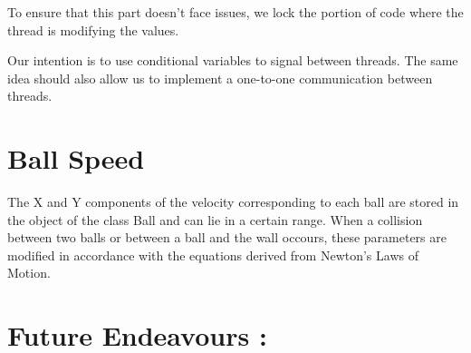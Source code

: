 \documentclass[]{article}
\begin{document}
To ensure that this part doesn't face issues, we lock the portion of code where the thread is modifying the values.

Our intention is to use conditional variables to signal between threads. The same idea should also allow us to implement a one-to-one communication between threads.

\begin{flushleft}


\end{flushleft}

\section{Ball Speed}

\begin{flushleft}

The X and Y components of the velocity corresponding to each ball are stored in the  object of the class Ball and can lie in a certain range. When a collision between two balls or between a ball and the wall occours, these parameters are modified in accordance with the equations derived from Newton's Laws of Motion.  

\end{flushleft}


\section{Future Endeavours :}
\end{document}
